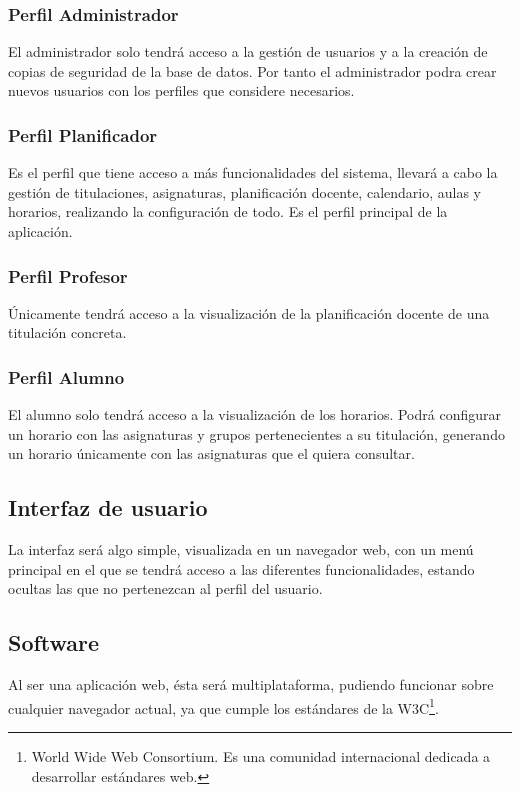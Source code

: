 \documentclass[a4paper,11pt]{article} %
\begin{document}
\subsubsection{Perfil Administrador}

El administrador solo tendrá acceso a la gestión de usuarios y a la creación de copias de seguridad de la base de datos. Por tanto el administrador podra crear nuevos usuarios con los perfiles que considere necesarios.

\subsubsection{Perfil Planificador}
Es el perfil que tiene acceso a más funcionalidades del sistema, llevará a cabo la gestión de titulaciones, asignaturas, planificación docente, calendario, aulas y horarios, realizando la configuración de todo. Es el perfil principal de la aplicación.

\subsubsection{Perfil Profesor}
Únicamente tendrá acceso a la visualización de la planificación docente de una titulación concreta.

\subsubsection{Perfil Alumno}
El alumno solo tendrá acceso a la visualización de los horarios. Podrá configurar un horario con las asignaturas y grupos pertenecientes a su titulación, generando un horario únicamente con las asignaturas que el quiera consultar.

\subsection{Interfaz de usuario}
La interfaz será algo simple, visualizada en un navegador web, con un menú principal en el que se tendrá acceso a las diferentes funcionalidades, estando ocultas las que no pertenezcan al perfil del usuario.

\subsection{Software}
Al ser una aplicación web, ésta será multiplataforma, pudiendo funcionar sobre cualquier navegador actual, ya que cumple los estándares de la W3C\footnote{World Wide Web Consortium. Es una comunidad internacional dedicada a desarrollar estándares web.}.
\end{document}
